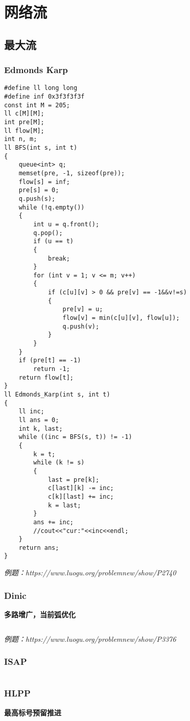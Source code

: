 \section{网络流}
\subsection{最大流}
\subsubsection{Edmonds Karp}
\begin{lstlisting}
#define ll long long
#define inf 0x3f3f3f3f
const int M = 205;
ll c[M][M];
int pre[M];
ll flow[M];
int n, m;
ll BFS(int s, int t)
{
    queue<int> q;
    memset(pre, -1, sizeof(pre));
    flow[s] = inf;
    pre[s] = 0;
    q.push(s);
    while (!q.empty())
    {
        int u = q.front();
        q.pop();
        if (u == t)
        {
            break;
        }
        for (int v = 1; v <= m; v++)
        {
            if (c[u][v] > 0 && pre[v] == -1&&v!=s)
            {
                pre[v] = u;
                flow[v] = min(c[u][v], flow[u]);
                q.push(v);
            }
        }
    }
    if (pre[t] == -1)
        return -1;
    return flow[t];
}
ll Edmonds_Karp(int s, int t)
{
    ll inc;
    ll ans = 0;
    int k, last;
    while ((inc = BFS(s, t)) != -1)
    {
        k = t;
        while (k != s)
        {
            last = pre[k];
            c[last][k] -= inc;
            c[k][last] += inc;
            k = last;
        }
        ans += inc;
        //cout<<"cur:"<<inc<<endl;
    }
    return ans;
}
\end{lstlisting}
\emph{例题：https://www.luogu.org/problemnew/show/P2740}

\subsubsection{Dinic}
\textbf{多路增广，当前弧优化}
\begin{lstlisting}
\end{lstlisting}
\emph{例题：https://www.luogu.org/problemnew/show/P3376}

\subsubsection{ISAP}
\begin{lstlisting}    
\end{lstlisting}
\subsubsection{HLPP}
\textbf{最高标号预留推进}
\begin{lstlisting}
\end{lstlisting}